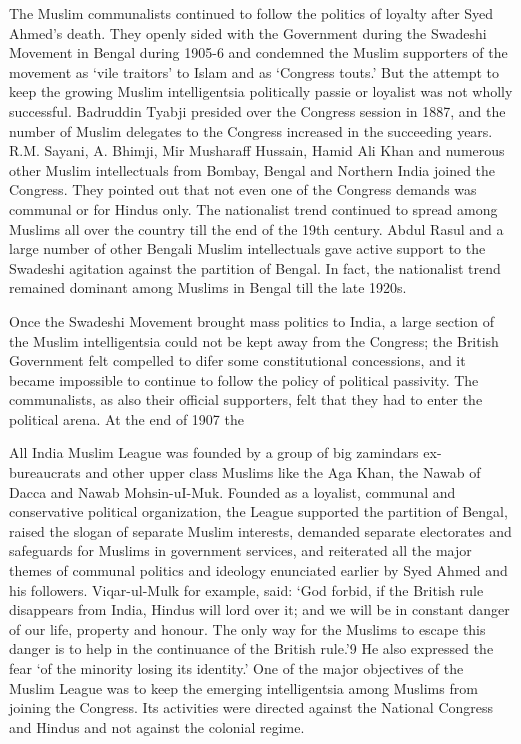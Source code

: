 \begin{multicols}{2}
The Muslim communalists continued to follow the politics of loyalty after Syed Ahmed's death. They openly sided with the Government during the Swadeshi Movement in Bengal during 1905-6 and condemned the Muslim supporters of the movement as `vile traitors' to Islam and as `Congress touts.' But the attempt to keep the growing Muslim intelligentsia politically passie or loyalist was not wholly successful. Badruddin Tyabji presided over the Congress session in 1887, and the number of Muslim delegates to the Congress increased in the succeeding years. R.M. Sayani, A. Bhimji, Mir Musharaff Hussain, Hamid Ali Khan and numerous other Muslim intellectuals from Bombay, Bengal and Northern India joined the Congress. They pointed out that not even one of the Congress demands was communal or for Hindus only. The nationalist trend continued to spread among Muslims all over the country till the end of the 19th century. Abdul Rasul and a large number of other Bengali Muslim intellectuals gave active support to the Swadeshi agitation against the partition of Bengal. In fact, the nationalist trend remained dominant among Muslims in Bengal till the late 1920s. 

Once the Swadeshi Movement brought mass politics to India, a large section of the Muslim intelligentsia could not be kept away from the Congress; the British Government felt compelled to difer some constitutional concessions, and it became impossible to continue to follow the policy of political passivity. The communalists, as also their official supporters, felt that they had to enter the political arena. At the end of 1907 the 

All India Muslim League was founded by a group of big zamindars ex-bureaucrats and other upper class Muslims like the Aga Khan, the Nawab of Dacca and Nawab Mohsin-uI-Muk. Founded as a loyalist, communal and conservative political organization, the League supported the partition of Bengal, raised the slogan of separate Muslim interests, demanded separate electorates and safeguards for Muslims in government services, and reiterated all the major themes of communal politics and ideology enunciated earlier by Syed Ahmed and his followers. Viqar-ul-Mulk for example, said: `God forbid, if the British rule disappears from India, Hindus will lord over it; and we will be in constant danger of our life, property and honour. The only way for the Muslims to escape this danger is to help in the continuance of the British rule.'9 He also expressed the fear `of the minority losing its identity.' One of the major objectives of the Muslim League was to keep the emerging intelligentsia among Muslims from joining the Congress. Its activities were directed against the National Congress and Hindus and not against the colonial regime. 


\end{multicols}
